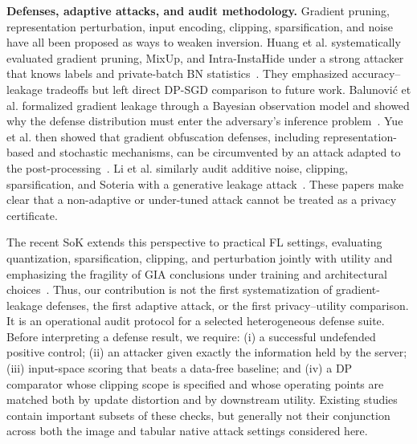 \textbf{Defenses, adaptive attacks, and audit methodology.}
Gradient pruning, representation perturbation, input encoding, clipping, sparsification, and noise have all been proposed as ways to weaken inversion. Huang et al. systematically evaluated gradient pruning, MixUp, and Intra-InstaHide under a strong attacker that knows labels and private-batch BN statistics~\cite{huang2021evaluating}. They emphasized accuracy--leakage tradeoffs but left direct DP-SGD comparison to future work. Balunovi\'{c} et al. formalized gradient leakage through a Bayesian observation model and showed why the defense distribution must enter the adversary's inference problem~\cite{balunovic2022bayesian}. Yue et al. then showed that gradient obfuscation defenses, including representation-based and stochastic mechanisms, can be circumvented by an attack adapted to the post-processing~\cite{yue2023obfuscation}. Li et al. similarly audit additive noise, clipping, sparsification, and Soteria with a generative leakage attack~\cite{li2022auditing}. These papers make clear that a non-adaptive or under-tuned attack cannot be treated as a privacy certificate.

The recent SoK extends this perspective to practical FL settings, evaluating quantization, sparsification, clipping, and perturbation jointly with utility and emphasizing the fragility of GIA conclusions under training and architectural choices~\cite{du2025sok}. Thus, our contribution is not the first systematization of gradient-leakage defenses, the first adaptive attack, or the first privacy--utility comparison. It is an operational audit protocol for a selected heterogeneous defense suite. Before interpreting a defense result, we require: (i) a successful undefended positive control; (ii) an attacker given exactly the information held by the server; (iii) input-space scoring that beats a data-free baseline; and (iv) a DP comparator whose clipping scope is specified and whose operating points are matched both by update distortion and by downstream utility. Existing studies contain important subsets of these checks, but generally not their conjunction across both the image and tabular native attack settings considered here.

